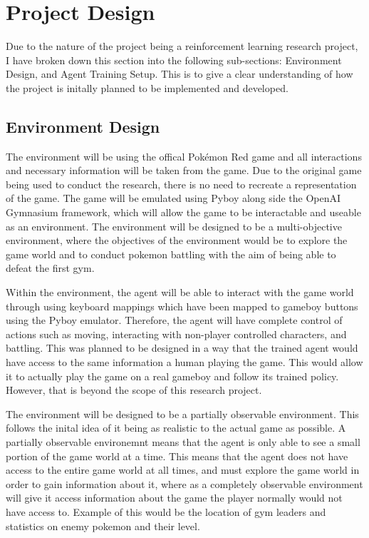 \section{Project Design}

Due to the nature of the project being a reinforcement learning research project, I have broken down this section into the following sub-sections: Environment Design, and Agent Training Setup. This is to give a clear understanding of how the project is initally planned to be implemented and developed.

\subsection{Environment Design}

The environment will be using the offical Pokémon Red game and all interactions and necessary information will be taken from the game. Due to the original game being used to conduct the research, there is no need to recreate a representation of the game. The game will be emulated using Pyboy along side the OpenAI Gymnasium framework, which will allow the game to be interactable and useable as an environment. The environment will be designed to be a multi-objective environment, where the objectives of the environment would be to explore the game world and to conduct pokemon battling with the aim of being able to defeat the first gym. 

Within the environment, the agent will be able to interact with the game world through using keyboard mappings which have been mapped to gameboy buttons using the Pyboy emulator. Therefore, the agent will have complete control of actions such as moving, interacting with non-player controlled characters, and battling. This was planned to be designed in a way that the trained agent would have access to the same information a human playing the game. This would allow it to actually play the game on a real gameboy and follow its trained policy. However, that is beyond the scope of this research project.

The environment will be designed to be a partially observable environment. This follows the inital idea of it being as realistic to the actual game as possible. A partially observable environemnt means that the agent is only able to see a small portion of the game world at a time. This means that the agent does not have access to the entire game world at all times, and must explore the game world in order to gain information about it, where as a completely observable environment will give it access information about the game the player normally would not have access to. Example of this would be the location of gym leaders and statistics on enemy pokemon and their level. 

